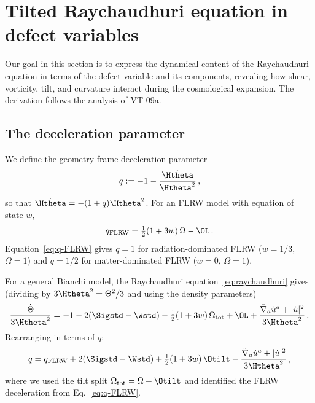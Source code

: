 \section{Tilted Raychaudhuri equation in defect variables}
\label{sec:tilt-raych}

Our goal in this section is to express the dynamical content
of the Raychaudhuri equation in terms of the defect variable
and its components, revealing how shear, vorticity, tilt, and
curvature interact during the cosmological expansion.  The
derivation follows the analysis of VT-09a.


\subsection{The deceleration parameter}\label{sec:decel-param}

We define the geometry-frame deceleration parameter
\begin{equation}\label{eq:q-def}
q := -1 - \frac{\dot{\Htheta}}{\Htheta^2}\,,
\end{equation}
so that $\dot{\Htheta} = -(1+q)\Htheta^2$.
For an FLRW model with equation of state $w$,
\begin{equation}\label{eq:q-FLRW}
q_{\mathrm{FLRW}} = \tfrac{1}{2}(1+3w)\,\Omega
  - \OL\,.
\end{equation}
Equation~\eqref{eq:q-FLRW} gives $q = 1$ for radiation-dominated FLRW ($w = 1/3$,
$\Omega = 1$) and $q = 1/2$ for matter-dominated FLRW
($w = 0$, $\Omega = 1$).

For a general Bianchi model, the Raychaudhuri
equation~\eqref{eq:raychaudhuri} gives (dividing by
$3\Htheta^2 = \Theta^2/3$ and using the density
parameters)
\begin{equation}\label{eq:raych-normalised}
\frac{\dot{\Theta}}{3\Htheta^2}
= -1 - 2(\Sigstd - \Wstd)
  - \tfrac{1}{2}(1+3w)\,\Omega_{\mathrm{tot}}
  + \OL
  + \frac{\tilde{\nabla}_a\dot{u}^a + |\dot{u}|^2}{3\Htheta^2}\,.
\end{equation}
Rearranging in terms of $q$:
\begin{equation}\label{eq:q-general}
q = q_{\mathrm{FLRW}}
  + 2(\Sigstd - \Wstd)
  + \tfrac{1}{2}(1+3w)\,\Otilt
  - \frac{\tilde{\nabla}_a\dot{u}^a
    + |\dot{u}|^2}{3\Htheta^2}\,,
\end{equation}
where we used the tilt split $\Omega_{\mathrm{tot}}
= \Omega + \Otilt$ and identified the FLRW deceleration
from Eq.~\eqref{eq:q-FLRW}.

